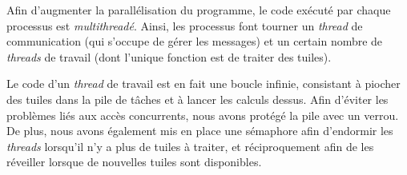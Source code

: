 Afin d'augmenter la parallélisation du programme, le code exécuté par chaque processus est \emph{multithreadé}. Ainsi, les processus font tourner un \emph{thread} de communication (qui s'occupe de gérer les messages) et un certain nombre de \emph{threads} de travail (dont l'unique fonction est de traiter des tuiles).

Le code d'un \emph{thread} de travail est en fait une boucle infinie, consistant à piocher des tuiles dans la pile de tâches et à lancer les calculs dessus. Afin d'éviter les problèmes liés aux accès concurrents, nous avons protégé la pile avec un verrou. De plus, nous avons également mis en place une sémaphore afin d'endormir les \emph{threads} lorsqu'il n'y a plus de tuiles à traiter, et réciproquement afin de les réveiller lorsque de nouvelles tuiles sont disponibles.